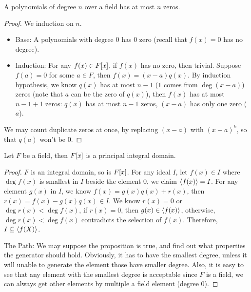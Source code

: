 \documentclass[../main.tex]{subfiles}
\begin{document}
\begin{theorem}
  A polynomials of degree $n$ over a field has at most $n$ zeros.
\end{theorem}
\begin{proof}
  We induction on $n$.
  \begin{itemize}
    \item Base: A polynomials with degree $0$ has $0$ zero (recall that $f(x) = 0$ has no degree).
    \item Induction: For any $f(x) \in F[x]$, if $f(x)$ has no zero, then trivial.
          Suppose $f(a) = 0$ for some $a \in F$, then $f(x) = (x - a)q(x)$.
          By induction hypothesis, we know $q(x)$ has at most $n - 1$ ($1$ comes from $\deg (x - a)$)
          zeros (note that $a$ can be the zero of $q(x)$), then $f(x)$ has at most $n - 1 + 1$
          zeros: $q(x)$ has at most $n - 1$ zeros, $(x - a)$ has only one zero ($a$).
  \end{itemize}

  We may count duplicate zeros at once, by replacing $(x - a)$ with $(x - a)^k$,
  so that $q(a)$ won't be $0$.
\end{proof}

\setcounter{theorem}{3}
\begin{theorem}
  Let $F$ be a field, then $F[x]$ is a principal integral domain.
\end{theorem}
\begin{proof}
  $F$ is an integral domain, so is $F[x]$.
  For any ideal $I$, let $f(x) \in I$ where $\deg f(x)$ is smallest in $I$ beside the element $0$,
  we claim $\langle f(x) \rangle = I$. For any element $g(x)$ in $I$, we know $f(x) = g(x)q(x) + r(x)$,
  then $r(x) = f(x) - g(x)q(x) \in I$.
  We know $r(x) = 0$ or $\deg r(x) < \deg f(x)$, if $r(x) = 0$, then $g(x) \in \langle f(x) \rangle$,
  otherwise, $\deg r(x) < \deg f(x)$ contradicts the selection of $f(x)$.
  Therefore, $I \subseteq \langle f(X) \rangle$.

  The Path: We may suppose the proposition is true, and find out what properties
  the generator should hold. Obviously, it has to have the smallest degree, unless
  it will unable to generate the element those have smaller degree. Also, it is
  easy to see that any element with the smallest degree is acceptable since $F$ is a field,
  we can always get other elements by multiple a field element (degree $0$).
\end{proof}
\end{document}
